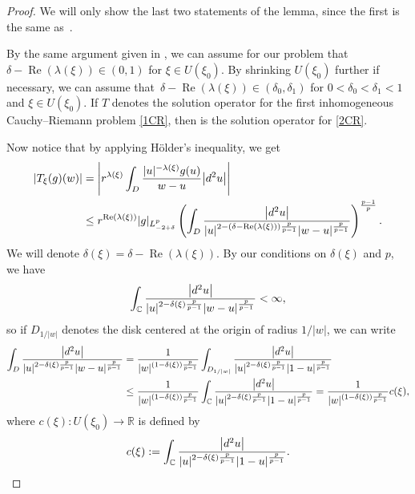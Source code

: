 \documentclass[11pt]{article}
\numberwithin{equation}{section}
\numberwithin{equation}{section}
\begin{document}
\begin{proof}
We will only show the last two statements of the lemma, since the first is the same as~\cite[Lemma 7.2]{BB04}.

By the same argument given in \cite[Lemma 7.2]{BB04}, we can assume for our problem that $\delta -\operatorname{Re}(\lambda(\xi))\in (0,1)$ for $\xi \in U(\xi_0)$. By shrinking $U(\xi_0)$ further if necessary, we can assume that~${\delta -\operatorname{Re}(\lambda(\xi))\in (\delta_0,\delta_1)}$ for $0<\delta_0<\delta_1<1$ and $\xi \in U(\xi_0)$. If $T$ denotes the solution operator for the first inhomogeneous Cauchy--Riemann problem \eqref{1CR}, then  is the solution operator for \eqref{2CR}.

Now notice that by applying H\"{o}lder's inequality, we get
\begin{align}
 |T_{\xi}(g)(w)|&=\Biggl|r^{\lambda(\xi)}\int_{D}\frac{|u|^{-\lambda(\xi)}g(u)}{w-u}\big|{\rm d}^2u\big|\Biggr|\nonumber\\
 &\leq r^{\operatorname{Re}(\lambda(\xi))}|g|_{L^p_{-2+\delta}}\left(\int_D \frac{\big|{\rm d}^2u\big|}{|u|^{2-(\delta -\operatorname{Re}(\lambda(\xi)))\frac{p}{p-1}}|w-u|^{\frac{p}{p-1}}}\right)^{\frac{p-1}{p}}.\label{B7}
\end{align}
We will denote $\delta(\xi)=\delta - \operatorname{Re}(\lambda(\xi))$. By our conditions on $\delta(\xi)$ and $p$, we have
\begin{equation*}
\int_{\mathbb{C}} \frac{\big|{\rm d}^2u\big|}{|u|^{2-\delta(\xi)\frac{p}{p-1}}|w-u|^{\frac{p}{p-1}}}<\infty,
\end{equation*}
so if $D_{1/|w|}$ denotes the disk centered at the origin of radius $1/|w|$, we can write
\begin{align*}
\int_D \frac{\big|{\rm d}^2u\big|}{|u|^{2-\delta(\xi)\frac{p}{p-1}}|w-u|^{\frac{p}{p-1}}}&=\frac{1}{|w|^{(1-\delta(\xi))\frac{p}{p-1}}}\int_{D_{1/|w|}}\frac{\big|{\rm d}^2u\big|}{|u|^{2-\delta(\xi)\frac{p}{p-1}}|1-u|^{\frac{p}{p-1}}}\\
&\leq \frac{1}{|w|^{(1-\delta(\xi))\frac{p}{p-1}}}\int_{\mathbb{C}}\frac{\big|{\rm d}^2u\big|}{|u|^{2-\delta(\xi)\frac{p}{p-1}}|1-u|^{\frac{p}{p-1}}}
=\frac{1}{|w|^{(1-\delta(\xi))\frac{p}{p-1}}} c(\xi),
\end{align*}
where $c(\xi)\colon U(\xi_0) \to \mathbb{R}$ is defined by
\begin{equation*}
 c(\xi):=\int_{\mathbb{C}}\frac{\big|{\rm d}^2u\big|}{|u|^{2-\delta(\xi)\frac{p}{p-1}}|1-u|^{\frac{p}{p-1}}}.
\end{equation*}


\end{proof}
\end{document}
